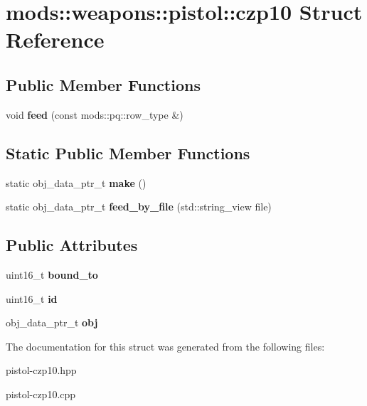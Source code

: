 \hypertarget{structmods_1_1weapons_1_1pistol_1_1czp10}{}\section{mods\+:\+:weapons\+:\+:pistol\+:\+:czp10 Struct Reference}
\label{structmods_1_1weapons_1_1pistol_1_1czp10}
\subsection*{Public Member Functions}
\begin{DoxyCompactItemize}
\item 
\mbox{\label{structmods_1_1weapons_1_1pistol_1_1czp10_a110f9f877efe774faca0aa6c2c84c7da}} 
void {\bfseries feed} (const mods\+::pq\+::row\+\_\+type \&)
\end{DoxyCompactItemize}
\subsection*{Static Public Member Functions}
\begin{DoxyCompactItemize}
\item 
\mbox{\label{structmods_1_1weapons_1_1pistol_1_1czp10_a174328e23dc31aa2c5f0bf745affe2e7}} 
static obj\+\_\+data\+\_\+ptr\+\_\+t {\bfseries make} ()
\item 
\mbox{\label{structmods_1_1weapons_1_1pistol_1_1czp10_aacb603607e7b6ffe9a1556539f847b3b}} 
static obj\+\_\+data\+\_\+ptr\+\_\+t {\bfseries feed\+\_\+by\+\_\+file} (std\+::string\+\_\+view file)
\end{DoxyCompactItemize}
\subsection*{Public Attributes}
\begin{DoxyCompactItemize}
\item 
\mbox{\label{structmods_1_1weapons_1_1pistol_1_1czp10_a973683b1d2c666c622157faca726e2a8}} 
uint16\+\_\+t {\bfseries bound\+\_\+to}
\item 
\mbox{\label{structmods_1_1weapons_1_1pistol_1_1czp10_ae8a4aeaebe22e468174bdb0e99d477a2}} 
uint16\+\_\+t {\bfseries id}
\item 
\mbox{\label{structmods_1_1weapons_1_1pistol_1_1czp10_a58e6d5b571be71fcc69fd40a0a16a933}} 
obj\+\_\+data\+\_\+ptr\+\_\+t {\bfseries obj}
\end{DoxyCompactItemize}


The documentation for this struct was generated from the following files\+:\begin{DoxyCompactItemize}
\item 
pistol-\/czp10.\+hpp\item 
pistol-\/czp10.\+cpp\end{DoxyCompactItemize}
